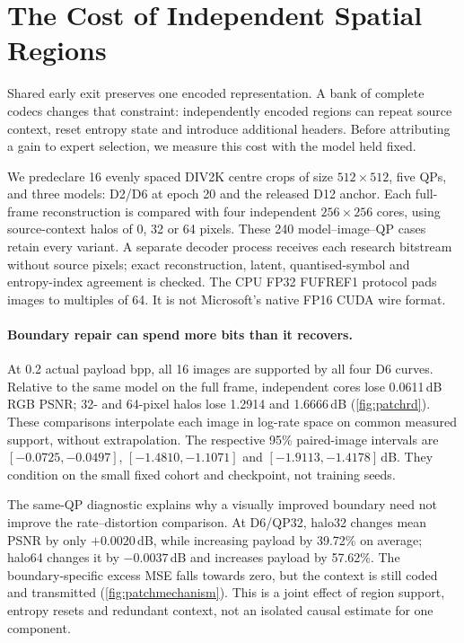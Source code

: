 \section{The Cost of Independent Spatial Regions}
\label{sec:patchcontrol}

Shared early exit preserves one encoded representation. A bank of complete
codecs changes that constraint: independently encoded regions can repeat
source context, reset entropy state and introduce additional headers.
Before attributing a gain to expert selection, we measure this cost with
the model held fixed.

We predeclare 16 evenly spaced DIV2K centre crops of size $512\times512$,
five QPs, and three models: D2/D6 at epoch 20 and the released D12 anchor.
Each full-frame reconstruction is compared with four independent
$256\times256$ cores, using source-context halos of 0, 32 or 64 pixels.
These 240 model--image--QP cases retain every variant. A separate decoder
process receives each research bitstream without source pixels; exact
reconstruction, latent, quantised-symbol and entropy-index agreement is
checked. The CPU FP32 FUFREF1 protocol pads images to multiples of 64.
It is not Microsoft's native FP16 CUDA wire format.

\paragraph{Boundary repair can spend more bits than it recovers.}
At 0.2 actual payload bpp, all 16 images are supported by all four D6 curves.
Relative to the same model on the full frame, independent cores lose
0.0611\,dB RGB PSNR; 32- and 64-pixel halos lose 1.2914 and 1.6666\,dB
(\cref{fig:patchrd}). These comparisons interpolate each image in log-rate
space on common measured support, without extrapolation. The respective
95\% paired-image intervals are $[-0.0725,-0.0497]$,
$[-1.4810,-1.1071]$ and $[-1.9113,-1.4178]$\,dB.
They condition on the small fixed cohort and checkpoint, not training seeds.

The same-QP diagnostic explains why a visually improved boundary need not
improve the rate--distortion comparison. At D6/QP32, halo32 changes mean
PSNR by only $+0.0020$\,dB, while increasing payload by 39.72\% on average;
halo64 changes it by $-0.0037$\,dB and increases payload by 57.62\%.
The boundary-specific excess MSE falls towards zero, but the context is
still coded and transmitted (\cref{fig:patchmechanism}). This is a joint
effect of region support, entropy resets and redundant context, not an
isolated causal estimate for one component.

